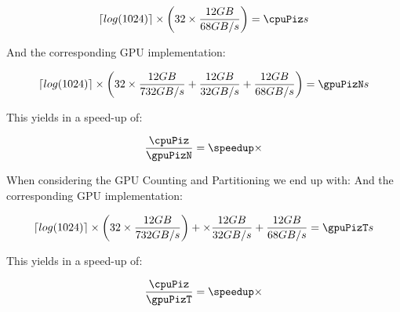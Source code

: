 \documentclass[]{article}
\begin{document}
\pgfmathsetmacro{}

\begin{center}
	\begin{equation}
		\lceil log(1024) \rceil \times \left ( \p \times \frac{ \s GB }{68 GB/s} \right )  = \cpuPiz s
	\end{equation}
\end{center}


And the corresponding GPU implementation:
\pgfmathsetmacro{}
\begin{center}
	\begin{equation}
		\lceil log(1024) \rceil \times \left ( 32 \times \frac{12 GB}{732 GB/s} + \frac{12 GB}{32 GB/s}  + \frac{12 GB}{68 GB/s} \right )=  \gpuPizN s
	\end{equation}
\end{center}

This yields in a speed-up of:
\pgfmathsetmacro\speedup{\cpuPiz / \gpuPizN}
\begin{center}
	\begin{equation}
		\frac{\cpuPiz}{\gpuPizN} = \speedup \times
	\end{equation}
\end{center}


When considering the GPU Counting and Partitioning we end up with:
\pgfmathsetmacro{}
And the corresponding GPU implementation:
\begin{center}
	\begin{equation}
		\lceil log(1024) \rceil \times \left ( \p \times \frac{\s GB}{732 GB/s} \right ) + \times \frac{\s GB}{32 GB/s}  + \frac{\s GB}{68 GB/s} = \gpuPizT s
	\end{equation}
\end{center}

This yields in a speed-up of:
\pgfmathsetmacro\speedup{\cpuPiz / \gpuPizT}
\begin{center}
	\begin{equation}
		\frac{\cpuPiz}{\gpuPizT} = \speedup \times
	\end{equation}
\end{center}

\vspace{5mm}

\pgfmathsetmacro{}
\pgfmathsetmacro{}
\pgfmathsetmacro{}
\pgfmathsetmacro{}
\end{document}
